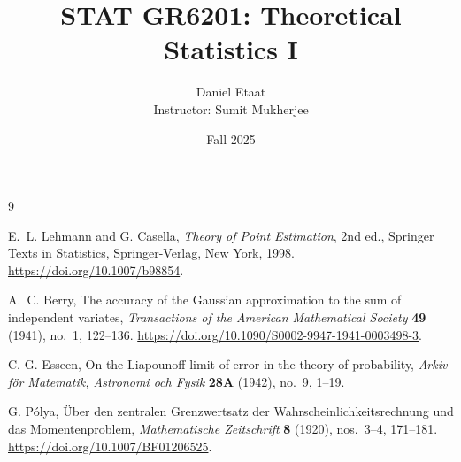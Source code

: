 \documentclass[12pt]{article}
\title{STAT GR6201: Theoretical Statistics I}
\author{Daniel Etaat \\ Instructor: Sumit Mukherjee}
\date{Fall 2025}
\theoremstyle{definition}
\begin{document}
\maketitle

\tableofcontents
\newpage 



\clearpage
{}
\begin{thebibliography}{9}

E.~L. Lehmann and G. Casella,
\emph{Theory of Point Estimation},
2nd ed., Springer Texts in Statistics,
Springer-Verlag, New York, 1998.
\url{https://doi.org/10.1007/b98854}.

A.~C. Berry,
The accuracy of the Gaussian approximation to the sum of independent variates,
\emph{Transactions of the American Mathematical Society}
\textbf{49} (1941), no.~1, 122--136.
\url{https://doi.org/10.1090/S0002-9947-1941-0003498-3}.

C.-G. Esseen,
On the Liapounoff limit of error in the theory of probability,
\emph{Arkiv f\"or Matematik, Astronomi och Fysik}
\textbf{28A} (1942), no.~9, 1--19.

G. P\'olya,
\"Uber den zentralen Grenzwertsatz der Wahrscheinlichkeitsrechnung
und das Momentenproblem,
\emph{Mathematische Zeitschrift}
\textbf{8} (1920), nos.~3--4, 171--181.
\url{https://doi.org/10.1007/BF01206525}.

\end{thebibliography}
\end{document}
